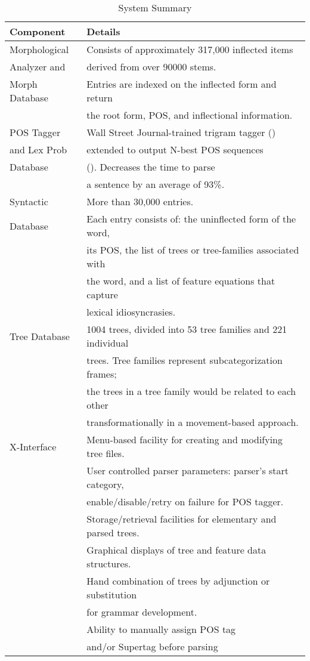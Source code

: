 \begin{table}[ht]
\small
\centering
\begin{tabular}{|l|l|} \hline
Component & Details \\ \hline
Morphological & Consists of approximately 317,000 inflected items \\ 
Analyzer and & derived from over 90000 stems. \\ 
Morph Database & Entries are indexed on the inflected form and return \\
& the root form, POS, and inflectional information.\\ \hline
POS Tagger & Wall Street Journal-trained
trigram tagger (\cite{kwc88})  \\ 
and  Lex Prob & extended to output N-best POS sequences  \\
Database & (\cite{soong90}). Decreases the time to parse \\
&a sentence by an average of 93\%. \\\hline
Syntactic &  More than 30,000 entries. \\
Database & Each entry consists of: the uninflected form of the word, \\
& its POS, the list of trees or tree-families associated with \\
& the word, and a list of feature equations that capture \\
&lexical idiosyncrasies. \\ \hline
Tree Database &  1004 trees, divided into 53 tree families and 221 individual \\
& trees. Tree families represent subcategorization frames; \\
& the trees in a tree family would be related to each other \\

& transformationally in a movement-based approach. \\ \hline
X-Interface & Menu-based facility for creating and modifying tree files. \\
&  User controlled parser parameters: parser's start category, \\ 
& enable/disable/retry on failure for POS tagger. \\
& Storage/retrieval facilities for elementary and parsed trees.\\
& Graphical displays of tree and feature data structures. \\
& Hand combination of trees by adjunction or substitution \\
& for grammar development. \\ 
& Ability to manually assign POS tag \\
& and/or Supertag before parsing \\ \hline
\end{tabular}
\caption{System Summary}
\label{sys-table}
\end{table}

